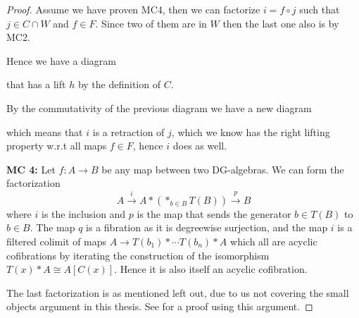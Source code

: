 \begin{proof}
Assume we have proven MC4, then we can factorize $i= f\circ j$ such that $j\in C\cap W$ and $f\in F$. Since two of them are in $W$ then the last one also is by MC2.

Hence we have a diagram 
\begin{center}
\end{center}
    
that has a lift $h$ by the definition of $C$. 

By the commutativity of the previous diagram we have a new diagram 
\begin{center}
\end{center}
which means that $i$ is a retraction of $j$, which we know has the right lifting property w.r.t all maps $f\in F$, hence $i$ does as well.



\textbf{MC 4:} Let $f:A\longrightarrow B$ be any map between two DG-algebras. We can form the factorization 
\begin{equation*}
    A\overset{i}\longrightarrow A\ast (\ast_{b\in B} T(B))\overset{p}\longrightarrow B
\end{equation*}
where $i$ is the inclusion and $p$ is the map that sends the generator $b \in T(B)$ to $b\in B$. The map $q$ is a fibration as it is  degreewise surjection, and the map $i$ is a filtered colimit of maps $A\longrightarrow T(b_1)\ast \cdots T(b_n)\ast A$ which all are acyclic cofibrations by iterating the construction of the isomorphism $T(x)\ast A \cong A[C(x)]$. Hence it is also itself an acyclic cofibration. 

The last factorization is as mentioned left out, due to us not covering the small objects argument in this thesis. See \cite[Lemma 3]{jardine} for a proof using this argument. 
\end{proof}


